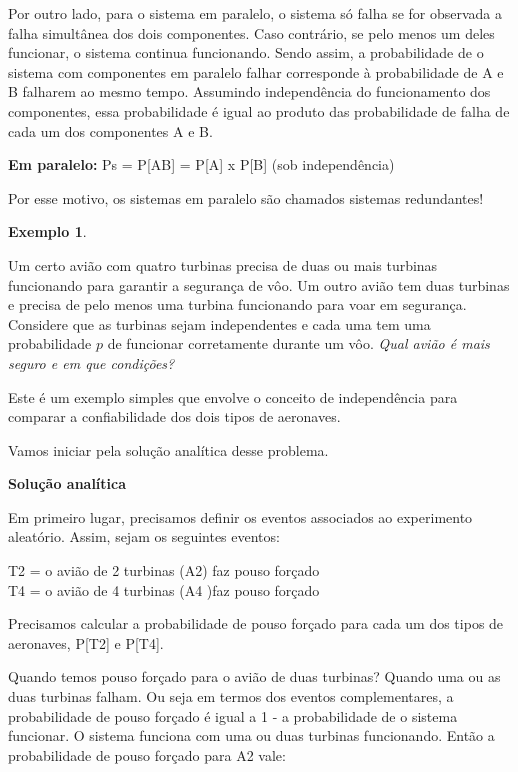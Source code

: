 \documentclass[
]{book}
\theoremstyle{definition}
\theoremstyle{definition}
\newtheorem{example}{Exemplo}[chapter]
\theoremstyle{definition}
\theoremstyle{remark}
\begin{document}
Por outro lado, para o sistema em paralelo, o sistema só falha se for observada a falha simultânea dos dois componentes. Caso contrário, se pelo menos um deles funcionar, o sistema continua funcionando. Sendo assim, a probabilidade de o sistema com componentes em paralelo falhar corresponde à probabilidade de A e B falharem ao mesmo tempo. Assumindo independência do funcionamento dos componentes, essa probabilidade é igual ao produto das probabilidade de falha de cada um dos componentes A e B.

\textbf{Em paralelo:} Ps = P{[}AB{]} = P{[}A{]} x P{[}B{]} (sob independência)

Por esse motivo, os sistemas em paralelo são chamados sistemas redundantes!

\begin{example}
\protect\hypertarget{exm:unnamed-chunk-5}{}{\label{exm:unnamed-chunk-5} }
\end{example}

Um certo avião com quatro turbinas precisa de duas ou mais turbinas funcionando para garantir a segurança de vôo. Um outro avião tem duas turbinas e precisa de pelo menos uma turbina funcionando para voar em segurança. Considere que as turbinas sejam independentes e cada uma tem uma probabilidade \(p\) de funcionar corretamente durante um vôo. \emph{Qual avião é mais seguro e em que condições?}

Este é um exemplo simples que envolve o conceito de independência para comparar a confiabilidade dos dois tipos de aeronaves.

Vamos iniciar pela solução analítica desse problema.

\textbf{Solução analítica}

Em primeiro lugar, precisamos definir os eventos associados ao experimento aleatório. Assim, sejam os seguintes eventos:

T2 = o avião de 2 turbinas (A2) faz pouso forçado\\
T4 = o avião de 4 turbinas (A4 )faz pouso forçado

Precisamos calcular a probabilidade de pouso forçado para cada um dos tipos de aeronaves, P{[}T2{]} e P{[}T4{]}.

Quando temos pouso forçado para o avião de duas turbinas?
Quando uma ou as duas turbinas falham. Ou seja em termos dos eventos complementares, a probabilidade de pouso forçado é igual a 1 - a probabilidade de o sistema funcionar. O sistema funciona com uma ou duas turbinas funcionando. Então a probabilidade de pouso forçado para A2 vale:
\end{document}
